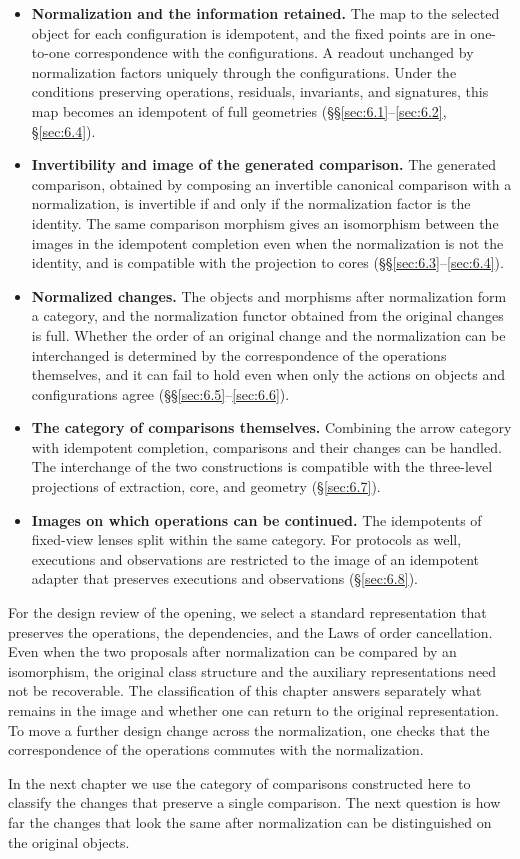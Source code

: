 \begin{itemize}
\item \textbf{Normalization and the information retained.} The map to the selected object
for each configuration is idempotent, and the fixed points are in one-to-one correspondence
with the configurations.
A readout unchanged by normalization factors uniquely through the configurations.
Under the conditions preserving operations, residuals, invariants, and signatures, this map
becomes an idempotent of full geometries (\S\S\ref{sec:6.1}--\ref{sec:6.2},
\S\ref{sec:6.4}).
\item \textbf{Invertibility and image of the generated comparison.} The generated
comparison, obtained by composing an invertible canonical comparison with a normalization,
is invertible if and only if the normalization factor is the identity.
The same comparison morphism gives an isomorphism between the images in the idempotent
completion even when the normalization is not the identity, and is compatible with the
projection to cores (\S\S\ref{sec:6.3}--\ref{sec:6.4}).
\item \textbf{Normalized changes.} The objects and morphisms after normalization form a category, and the normalization functor obtained from the original changes is full.
Whether the order of an original change and the normalization can be interchanged is
determined by the correspondence of the operations themselves, and it can fail to hold even
when only the actions on objects and configurations agree
(\S\S\ref{sec:6.5}--\ref{sec:6.6}).
\item \textbf{The category of comparisons themselves.} Combining the arrow category with
idempotent completion, comparisons and their changes can be handled.
The interchange of the two constructions is compatible with the three-level projections of
extraction, core, and geometry (\S\ref{sec:6.7}).
\item \textbf{Images on which operations can be continued.} The idempotents of fixed-view
lenses split within the same category.
For protocols as well, executions and observations are restricted to the image of an
idempotent adapter that preserves executions and observations (\S\ref{sec:6.8}).
\end{itemize}

For the design review of the opening, we select a standard representation that preserves
the operations, the dependencies, and the Laws of order cancellation.
Even when the two proposals after normalization can be compared by an isomorphism, the
original class structure and the auxiliary representations need not be recoverable.
The classification of this chapter answers separately what remains in the image and whether
one can return to the original representation.
To move a further design change across the normalization, one checks that the
correspondence of the operations commutes with the normalization.

In the next chapter we use the category of comparisons constructed here to classify the
changes that preserve a single comparison.
The next question is how far the changes that look the same after normalization can be
distinguished on the original objects.
